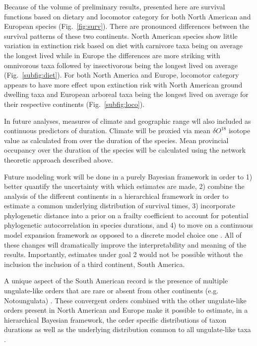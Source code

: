 \documentclass[11pt,letterpaper]{article}
\begin{document}
Because of the volume of preliminary results, presented here are survival functions based on dietary and locomotor category for both North American and European species (Fig.~\ref{fig:surv}). There are pronounced differences between the survival patterns of these two continents. North American species show little variation in extinction risk based on diet with carnivore taxa being on average the longest lived while in Europe the differences are more striking with omnivorous taxa followed by insectivorous being the longest lived on average (Fig.~\ref{subfig:diet}). For both North America and Europe, locomotor category appears to have more effect upon extinction risk with North American ground dwelling taxa and European arboreal taxa being the longest lived on average for their respective continents (Fig.~\ref{subfig:loco}).

In future analyses, measures of climate and geographic range wll also included as continuous predictors of duration. Climate will be proxied via mean \(\delta O^{18}\) isotope value as calculated from \citet{Zachos2008} over the duration of the species. Mean provincial occupancy over the duration of the species will be calculated using the network theoretic approach described above.

Future modeling work will be done in a purely Bayesian framework in order to 1) better quantify the uncertainty with which estimates are made, 2) combine the analysis of the different continents in a hierarchical framework in order to estimate a common underlying distribution of survival times, 3) incorporate phylogenetic distance into a prior on a frailty coefficient \citep{Banerjee2003a,Ibrahim2001} to account for potential phylogenetic autocorrelation in species durations, and 4) to move on a continuous model expansion framework as opposed to a discrete model choice one \citep{Gelman2013d}. All of these changes will dramatically improve the interpretability and meaning of the results. Importantly, estimates under goal 2 would not be possible without the inclusion the inclusion of a third continent, South America. 

A unique aspect of the South American record is the presence of multiple ungulate-like orders that are rare or absent from other continents (e.g. Notoungulata) \citep{Marshall1982,Macfadden1997,Macfadden2006,Flynn1998a}. These convergent orders combined with the other ungulate-like orders present in North American and Europe make it possible to estimate, in a hierarchical Bayesian framework, the order specific distributions of taxon durations as well as the underlying distribution common to all ungulate-like taxa \citep{Gelman2013d}.
\end{document}
